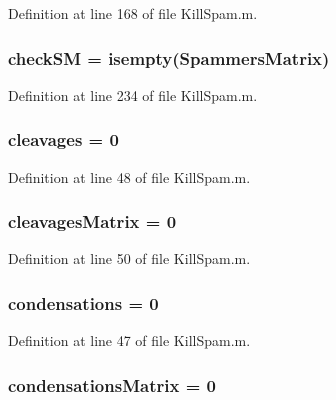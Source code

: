 Definition at line 168 of file Kill\-Spam.\-m.

\hypertarget{a00029_ae80cf4c5bf659247b45bbad5d22dec52}{
\subsubsection[{check\-S\-M}]{ check\-S\-M = {\bf isempty}({\bf Spammers\-Matrix})}}\label{a00029_ae80cf4c5bf659247b45bbad5d22dec52}


Definition at line 234 of file Kill\-Spam.\-m.

\hypertarget{a00029_a89060c6979e5a4ff7b0985b35f295695}{
\subsubsection[{cleavages}]{\setlength{\rightskip}{0pt plus 5cm}cleavages = 0}}\label{a00029_a89060c6979e5a4ff7b0985b35f295695}


Definition at line 48 of file Kill\-Spam.\-m.

\hypertarget{a00029_a1a691fb4f955887edfa538e91479fafe}{
\subsubsection[{cleavages\-Matrix}]{\setlength{\rightskip}{0pt plus 5cm}cleavages\-Matrix = 0}}\label{a00029_a1a691fb4f955887edfa538e91479fafe}


Definition at line 50 of file Kill\-Spam.\-m.

\hypertarget{a00029_ad3aa27d88a7e9d77d8334155860269bb}{
\subsubsection[{condensations}]{ condensations = 0}}\label{a00029_ad3aa27d88a7e9d77d8334155860269bb}


Definition at line 47 of file Kill\-Spam.\-m.

\hypertarget{a00029_afaba8eef2f8f4e4dda2e893a19e55a94}{
\subsubsection[{condensations\-Matrix}]{\setlength{\rightskip}{0pt plus 5cm}condensations\-Matrix = 0}}\label{a00029_afaba8eef2f8f4e4dda2e893a19e55a94}


